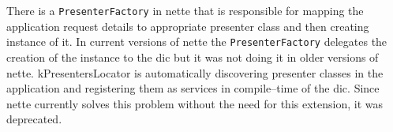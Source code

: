  \label{sec:state:presenters-locator}

There is a \lstinline{PresenterFactory} in \gls{nette} that is responsible for mapping the application request details to appropriate presenter class and then creating instance of it. In current versions of \gls{nette} the \lstinline{PresenterFactory} delegates the creation of the instance to the \gls{dic} but it was not doing it in older versions of \gls{nette}. \gls{kPresentersLocator} is automatically discovering presenter classes in the application and registering them as services in compile--time of the \gls{dic}. Since \gls{nette} currently solves this problem without the need for this extension, it was deprecated.
